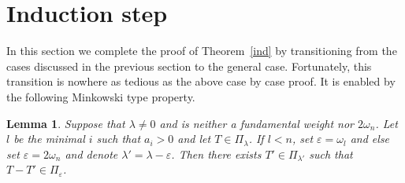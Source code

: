 \documentclass[10pt,a4paper]{article}
\newtheorem{lemm}[theo]{Lemma}
\theoremstyle{remark}\newtheorem{rema}[theo]{Remark}
\newcommand{\la}{\lambda}
\begin{document}
\section{Induction step}

In this section we complete the proof of Theorem~\ref{ind} by transitioning from the cases discussed in the previous section to the general case. Fortunately, this transition is nowhere as tedious as the above case by case proof. It is enabled by the following Minkowski type property.

\begin{lemm}\label{mink}
Suppose that $\la\neq 0$ and is neither a fundamental weight nor $2\omega_n$. Let $l$ be the minimal $i$ such that $a_i>0$ and let $T\in\Pi_\la$. If $l<n$, set $\varepsilon=\omega_l$ and else set $\varepsilon=2\omega_n$ and denote $\lambda'=\lambda-\varepsilon$. Then there exists $T'\in\Pi_{\lambda'}$ such that $T-T'\in\Pi_\varepsilon$.
\end{lemm}
\end{document}
